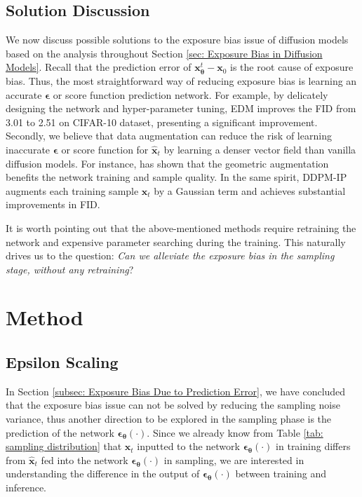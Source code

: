 \documentclass{article} \usepackage{iclr2024_conference,times}
\begin{document}
\subsection{Solution Discussion}
We now discuss possible solutions to the exposure bias issue of diffusion models based on the analysis throughout Section \ref{sec: Exposure Bias in Diffusion Models}. Recall that the prediction error of $\pmb{x}^{t}_{\pmb{\theta}} - \pmb{x}_0$ is the root cause of exposure bias. Thus, the most straightforward way of reducing exposure bias is learning an accurate  $\pmb{\epsilon}$ or score function \citep{song2019generative} prediction network. For example, by delicately designing the network and hyper-parameter tuning, EDM \citep{karras2022elucidating} improves the FID from 3.01 to 2.51 on CIFAR-10 dataset, presenting a significant improvement. Secondly, we believe that data augmentation can reduce the risk of learning inaccurate $\pmb{\epsilon}$ or score function for $\hat{\pmb{x}}_{t}$ by learning a denser vector field than vanilla diffusion models. For instance, \citet{karras2022elucidating} has shown that the geometric augmentation \citep{karras2020training} benefits the network training and sample quality. In the same spirit, DDPM-IP \citep{ning2023input} augments each training sample $\pmb{x}_{t}$ by a Gaussian term and achieves substantial improvements in FID. 

It is worth pointing out that the above-mentioned methods require retraining the network and expensive parameter searching during the training. This naturally drives us to the question: \textit{Can we alleviate the exposure bias in the sampling stage, without any retraining}?




\section{Method}

\subsection{Epsilon Scaling}
In Section \ref{subsec: Exposure Bias Due to Prediction Error}, we have concluded that the exposure bias issue can not be solved by reducing the sampling noise variance, thus another direction to be explored in the sampling phase is the prediction of the network $\pmb{\epsilon_{\theta}}(\cdot)$. Since we already know from Table \ref{tab: sampling distribution} that $\pmb{x}_t$ inputted to the network $\pmb{\epsilon_{\theta}}(\cdot)$ in training differs from $\hat{\pmb{x}}_t$ fed into the network $\pmb{\epsilon_{\theta}}(\cdot)$ in sampling, we are interested in understanding the difference in the output of $\pmb{\epsilon_{\theta}}(\cdot)$ between training and inference.
\end{document}
